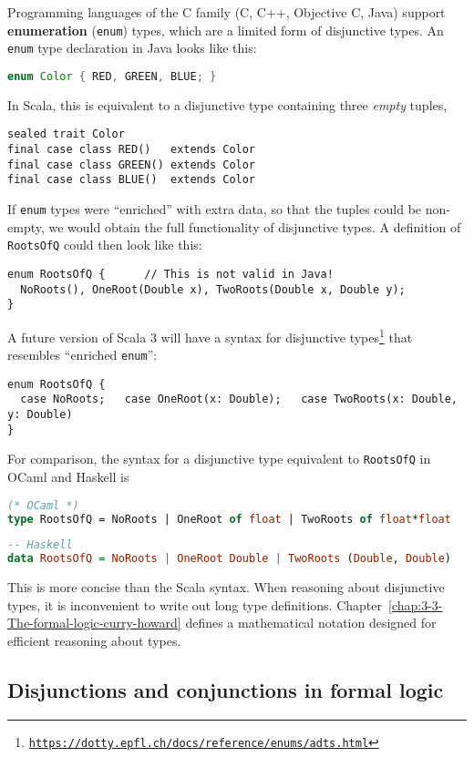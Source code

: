 Programming languages of the C family (C, C++, Objective C, Java)
support \textbf{enumeration} (\lstinline!enum!) types,
which are a limited form of disjunctive types. An \lstinline!enum!
type declaration in Java looks like this:
\begin{lstlisting}[language=Java]
enum Color { RED, GREEN, BLUE; } 
\end{lstlisting}
In Scala, this is equivalent to a disjunctive type containing three
\emph{empty} tuples,
\begin{lstlisting}
sealed trait Color
final case class RED()   extends Color
final case class GREEN() extends Color
final case class BLUE()  extends Color
\end{lstlisting}
If \lstinline!enum! types were \textsf{``}enriched\textsf{''} with extra data, so
that the tuples could be non-empty, we would obtain the full functionality
of disjunctive types. A definition of \lstinline!RootsOfQ! could
then look like this: 
\begin{lstlisting}
enum RootsOfQ {      // This is not valid in Java!
  NoRoots(), OneRoot(Double x), TwoRoots(Double x, Double y);
}
\end{lstlisting}
A future version of Scala 3 will have a syntax for disjunctive types\footnote{\texttt{\href{https://dotty.epfl.ch/docs/reference/enums/adts.html}{https://dotty.epfl.ch/docs/reference/enums/adts.html}}}
that resembles \textsf{``}enriched \lstinline!enum!\textsf{''}:
\begin{lstlisting}
enum RootsOfQ {
  case NoRoots;   case OneRoot(x: Double);   case TwoRoots(x: Double, y: Double)
}
\end{lstlisting}
For comparison, the syntax for a disjunctive type equivalent to \lstinline!RootsOfQ!
in OCaml and Haskell is
\begin{lstlisting}[language=Caml]
(* OCaml *)
type RootsOfQ = NoRoots | OneRoot of float | TwoRoots of float*float
\end{lstlisting}
\begin{lstlisting}[language=Haskell]
-- Haskell
data RootsOfQ = NoRoots | OneRoot Double | TwoRoots (Double, Double)
\end{lstlisting}
This is more concise than the Scala syntax. When reasoning about disjunctive
types, it is inconvenient to write out long type definitions. Chapter~\ref{chap:3-3-The-formal-logic-curry-howard}
defines a mathematical notation designed for efficient reasoning about
types.

\subsection{Disjunctions and conjunctions in formal logic\label{subsec:Disjunctions-and-conjunctions}}

